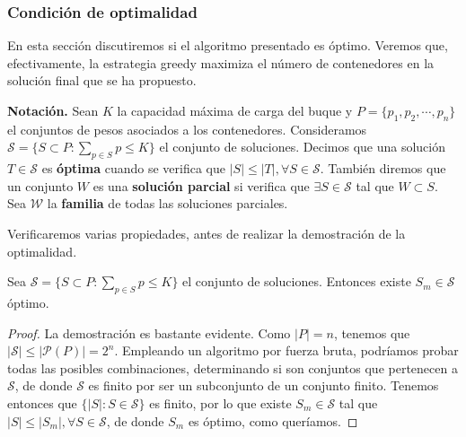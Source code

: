 \subsubsection{Condición de optimalidad}
En esta sección discutiremos si el algoritmo presentado es óptimo. Veremos que,
efectivamente, la estrategia greedy maximiza el número de contenedores 
en la solución final que se ha propuesto. 

\textbf{Notación.} Sean $K$ la capacidad máxima de carga del buque y
$P = \{p_1,p_2,\cdots,p_n\}$ el conjuntos de pesos asociados
a los contenedores. Consideramos $\mathcal{S} = \{S \subset P : 
\sum_{p \in S} p \leq K\}$ el conjunto de soluciones. Decimos que una solución
$T \in \mathcal{S}$ es \textbf{óptima} cuando se verifica que $|S| \leq |T|,
\forall S \in \mathcal{S}$. 
También diremos que un conjunto $W$ es una \textbf{solución parcial}
si verifica que $\exists S \in \mathcal S$ tal que $W \subset S$. Sea $\mathcal{W}$ 
la \textbf{familia} de todas las soluciones parciales.

Verificaremos varias propiedades, antes de realizar la demostración de la optimalidad.

\begin{lemma}
    Sea $\mathcal{S} = \{S \subset P : \sum_{p \in S} p \leq K\}$ el conjunto de soluciones. Entonces
    existe $S_m \in \mathcal S$ óptimo. 
\end{lemma}

\begin{proof}
    La demostración es bastante evidente. Como $|P| = n$, tenemos que $|\mathcal S| \leq |\mathcal P (P)| = 2^n$. 
    Empleando un algoritmo por fuerza bruta, podríamos probar todas las posibles combinaciones, determinando si
    son conjuntos que pertenecen a $\mathcal S$, de donde $\mathcal S$ es finito por ser un subconjunto de un conjunto finito. 
    Tenemos entonces que $\{|S| : S \in \mathcal S\}$ es finito, por lo que existe $S_m \in \mathcal S$ tal que
    $|S| \leq |S_m|, \forall S \in \mathcal S$, de donde $S_m$ es óptimo, como queríamos. 
\end{proof}



